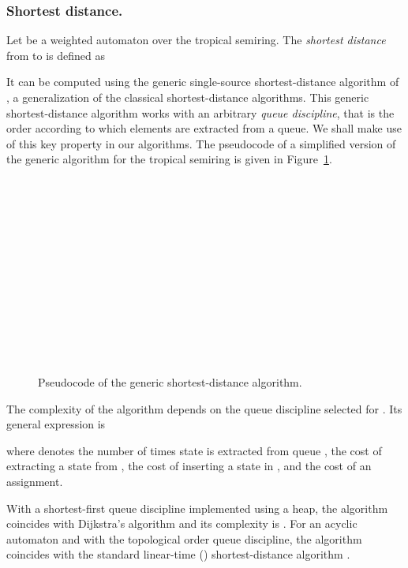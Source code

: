 \documentclass{llncs}
\newcommand{\0}{\overline{0}}
\newcommand{\1}{\overline{1}}
\newcommand{\+}{\oplus}
\renewcommand{\.}{\otimes}
\begin{document}
\subsubsection{Shortest distance.}
\label{sec:sd}

Let  be a weighted automaton over the tropical semiring. The {\em
shortest distance} from  to  is defined as

It can be computed using the generic single-source shortest-distance
algorithm of \cite{shortest-distance}, a generalization of the
classical shortest-distance algorithms. This generic shortest-distance
algorithm works with an arbitrary \emph{queue discipline}, that is the
order according to which elements are extracted from a queue.  We
shall make use of this key property in our algorithms. The pseudocode
of a simplified version of the generic algorithm for the tropical
semiring is given in Figure~\ref{fig:alg:shortest}.

\begin{figure}[ht]
{\small 

\bc
\li \FOR \EACH  \DO\\
\li \> \\
\li \\
\li \\
\li \WHILE  \DO\\
\li \>  \\
\li \>  \\
\li \> \FOR \EACH  \DO \\
\li \> \> \IF  \THEN\\
\li \> \> \> \\
\li \> \> \> \IF    \THEN\\
\li \> \> \> \> \\
\ec
}
\caption{Pseudocode of the generic shortest-distance algorithm.}
\label{fig:alg:shortest}
\end{figure}

The complexity of the algorithm depends on the queue discipline
selected for . Its general expression is

where  denotes the number of times state  is
extracted from queue ,  the cost of extracting a
state from ,  the cost of inserting a state in ,
and  the cost of an assignment.

With a shortest-first queue discipline implemented using a heap, the
algorithm coincides with Dijkstra's algorithm \cite{dijkstra} and its
complexity is . For an acyclic automaton and
with the topological order queue discipline, the algorithm coincides
with the standard linear-time () shortest-distance
algorithm \cite{rivest}.
\end{document}
